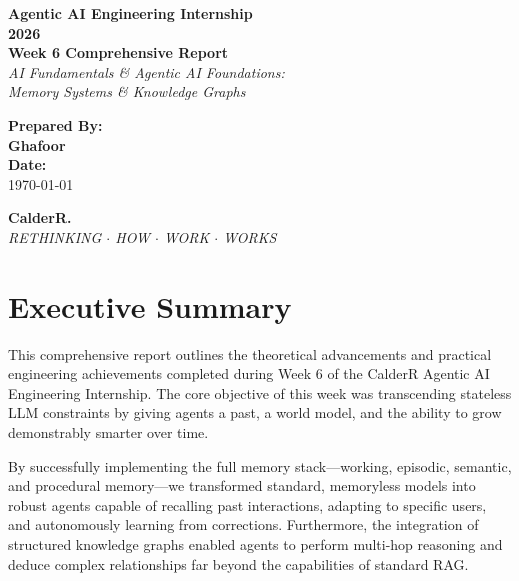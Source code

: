 \documentclass[12pt, a4paper]{article}
\begin{document}
\begin{titlepage}
    \centering
    \vspace*{2cm}
    
    {\Huge \textbf{\textcolor{primary}{Agentic AI Engineering Internship}}} \\[0.5cm]
    {\Huge \textbf{\textcolor{primary}{2026}}} \\[1.5cm]
    
    {\LARGE \textbf{Week 6 Comprehensive Report}} \\[0.5cm]
    {\Large \textit{AI Fundamentals \& Agentic AI Foundations: \\ Memory Systems \& Knowledge Graphs}} \\[2cm]
    
    \begin{tcolorbox}[colback=accent, colframe=primary, rounded corners, boxrule=1.5pt, width=0.75\textwidth, arc=4mm]
        \centering
        \vspace{0.4cm}
        {\Large \textbf{Prepared By:}} \\[0.2cm]
        {\Large \textbf{Ghafoor}} \\[0.4cm]
        {\large \textbf{Date:}} \\
        {\large \today}
        \vspace{0.4cm}
    \end{tcolorbox}
    
    \vfill
    
    {\huge \textbf{\textcolor{secondary}{CalderR.}}} \\[0.2cm]
    {\large \textit{RETHINKING $\cdot$ HOW $\cdot$ WORK $\cdot$ WORKS}}
    \vspace*{1cm}
\end{titlepage}

\tableofcontents
\newpage

\section{Executive Summary}
This comprehensive report outlines the theoretical advancements and practical engineering achievements completed during Week 6 of the CalderR Agentic AI Engineering Internship. The core objective of this week was transcending stateless LLM constraints by giving agents a past, a world model, and the ability to grow demonstrably smarter over time.

By successfully implementing the full memory stack---working, episodic, semantic, and procedural memory---we transformed standard, memoryless models into robust agents capable of recalling past interactions, adapting to specific users, and autonomously learning from corrections. Furthermore, the integration of structured knowledge graphs enabled agents to perform multi-hop reasoning and deduce complex relationships far beyond the capabilities of standard RAG.
\end{document}
